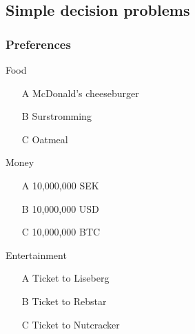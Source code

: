 \subsection{Simple decision problems}
\begin{frame}
  \frametitle{Preferences}
  \begin{example}
    \begin{block}{Food}
      \begin{itemize}
      \item[A] McDonald's cheeseburger
      \item[B] Surstromming
      \item[C] Oatmeal
      \end{itemize}
    \end{block}
    \begin{block}{Money}
      \begin{itemize}
      \item[A] 10,000,000 SEK
      \item[B] 10,000,000 USD
      \item[C] 10,000,000 BTC
      \end{itemize}
    \end{block}
    \begin{block}{Entertainment}
      \begin{itemize}
      \item[A] Ticket to Liseberg
      \item[B] Ticket to Rebstar
      \item[C] Ticket to Nutcracker
      \end{itemize}
    \end{block}
  \end{example}
\end{frame}

